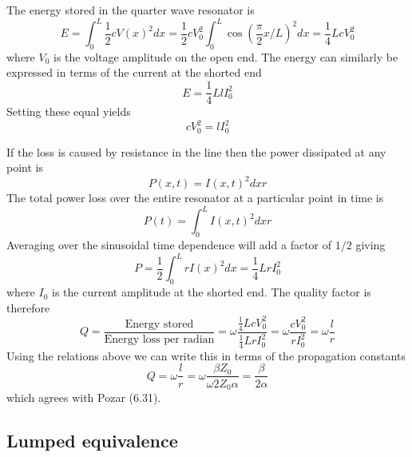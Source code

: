 \documentclass{article}
\begin{document}
The energy stored in the quarter wave resonator is \begin{equation}
E = \int_0^L \frac{1}{2} c V(x)^2 dx = \frac{1}{2}cV_0^2\int_0^L \cos\left( \frac{\pi}{2}x/L \right)^2 dx =  \frac{1}{4}Lc V_0^2 \end{equation}
where $V_0$ is the voltage amplitude on the open end. The energy can similarly be expressed in terms of the current at the shorted end \begin{equation}
E = \frac{1}{4}LlI_0^2 \end{equation}
Setting these equal yields \begin{equation}
cV_0^2 = lI_0^2 \end{equation}

If the loss is caused by resistance in the line then the power dissipated at any point is \begin{equation}
P(x,t) = I(x,t)^2 dx r \end{equation}
The total power loss over the entire resonator at a particular point in time is \begin{equation}
P(t) = \int_0^L I(x,t)^2 dx r \end{equation}
Averaging over the sinusoidal time dependence will add a factor of $1/2$ giving \begin{equation}
P = \frac{1}{2} \int_0^L r I(x)^2 dx = \frac{1}{4} L r I_0^2 \end{equation}
where $I_0$ is the current amplitude at the shorted end. The quality factor is therefore \begin{equation}
Q = \frac{\textrm{Energy stored}}{\textrm{Energy loss per radian}} = \omega \frac{\frac{1}{4}LcV_0^2} {\frac{1}{4}LrI_0^2}=\omega \frac{cV_0^2}{rI_0^2} = \omega \frac{l}{r}\end{equation}
Using the relations above we can write this in terms of the propagation constants \begin{equation}
Q = \omega \frac{l}{r} = \omega \frac{\beta Z_0}{\omega 2 Z_0 \alpha} = \frac{\beta}{2\alpha} \end{equation}
which agrees with Pozar (6.31).

\subsection{Lumped equivalence}
\end{document}
